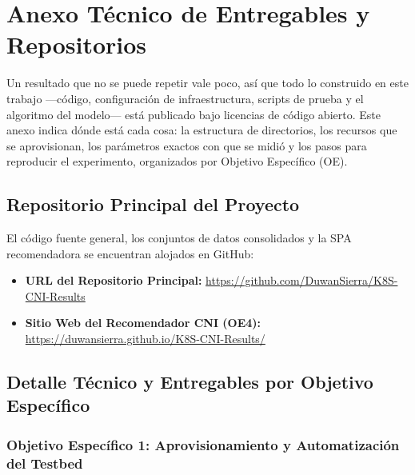\usetikzlibrary{positioning}

\chapter{Anexo Técnico de Entregables y Repositorios} \label{chap:apendice_a}

Un resultado que no se puede repetir vale poco, así que todo lo construido en
este trabajo ---código, configuración de infraestructura, scripts de prueba y el
algoritmo del modelo--- está publicado bajo licencias de código abierto. Este
anexo indica dónde está cada cosa: la estructura de directorios, los recursos
que se aprovisionan, los parámetros exactos con que se midió y los pasos para
reproducir el experimento, organizados por Objetivo Específico (OE).

\section{Repositorio Principal del Proyecto}

El código fuente general, los conjuntos de datos consolidados y la SPA
recomendadora se encuentran alojados en GitHub:

\begin{itemize}
    \item \textbf{URL del Repositorio Principal:}
          \url{https://github.com/DuwanSierra/K8S-CNI-Results}
    \item \textbf{Sitio Web del Recomendador CNI (OE4):}
          \url{https://duwansierra.github.io/K8S-CNI-Results/}
\end{itemize}

\section{Detalle Técnico y Entregables por Objetivo Específico}

\subsection{Objetivo Específico 1: Aprovisionamiento y Automatización del
Testbed}

